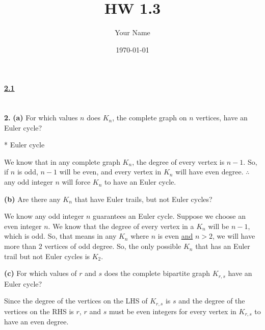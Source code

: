 \documentclass[12pt, letterpaper]{article}
\title{HW 1.3}
\author{Your Name}
\date{\today}
\begin{document}
\paragraph{\underline{2.1} \\ \\} 
\textbf{2.} \textbf{(a)} For which values $n$ does $K_{n}$, the complete graph on $n$ vertices, have an Euler cycle? \\ 
\begin{center}
* Euler cycle \ \Rightarrow {}
    \begin{framed}
        We know that in any complete graph $K_n$, the degree of every vertex is $n-1$. So, if $n$ is odd, $n-1$ will be even, and every vertex in $K_n$ will have even degree. $\therefore$ any odd integer $n$ will force $K_n$ to have an Euler cycle.
    \end{framed}
\end{center}
\textbf{(b)} Are there any $K_n$ that have Euler trails, but not Euler cycles?
\begin{center}
    \begin{framed}
        We know any odd integer $n$ guarantees an Euler cycle. Suppose we choose an even integer $n$. We know that the degree of every vertex in a $K_n$ will be $n-1$, which is odd. So, that means in any $K_n$ where $n$ is even \underline{and} $n > 2$, we will have more than $2$ vertices of odd degree. So, the only possible $K_n$ that has an Euler trail but not Euler cycles is $K_2$.
        
        \vspace{0.3cm}
    \end{framed}
\end{center}
\textbf{(c)} For which values of $r$ and $s$ does the complete bipartite graph $K_{r, s}$ have an Euler cycle?
\begin{center}
    \begin{framed}
        Since the degree of the vertices on the LHS of $K_{r,s}$ is $s$ and the degree of the vertices on the RHS is $r$, $r$ and $s$ must be even integers for every vertex in $K_{r,s}$ to have an even degree.
    \end{framed}
\end{center}
\end{document}
